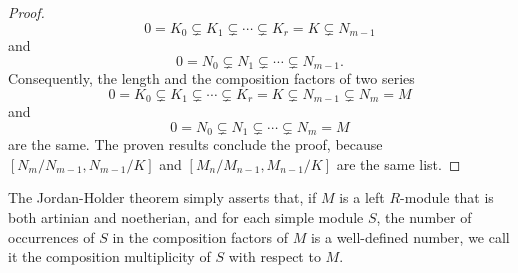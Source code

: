 \documentclass[12pt,a4paper]{report}
\theoremstyle{definition}
\theoremstyle{remark}
\theoremstyle{definition}
\begin{document}
\begin{proof}
\begin{equation*}
0=K_{0} \subsetneq K_{1} \subsetneq \cdots \subsetneq K_{r}=K \subsetneq N_{m-1}
\end{equation*}
and
\begin{equation*}
0=N_{0} \subsetneq N_{1} \subsetneq \cdots \subsetneq N_{m-1}.
\end{equation*}
Consequently, the length and the composition factors of two series 
\begin{equation*}
     0=K_{0} \subsetneq K_{1} \subsetneq \cdots \subsetneq K_{r}=K \subsetneq N_{m-1} \subsetneq N_{m}=M
\end{equation*}
and
\begin{equation*}
     0 = N_0 \subsetneq N_1\subsetneq \cdots \subsetneq N_m = M
\end{equation*}
are the same. The proven results conclude the proof, because $[N_m/N_{m-1}, N_{m-1}/K]$ and $[M_n/M_{n-1}, M_{n-1}/K]$ are the same list.
\end{proof}
The Jordan-Holder theorem simply asserts that, if $M$ is a left $R$-module that is both artinian and noetherian, and for each simple module $S$, the number of occurrences of $S$ in the composition factors of $M$ is a well-defined number, we call it the composition multiplicity of $S$ with respect to $M$.
\end{document}

